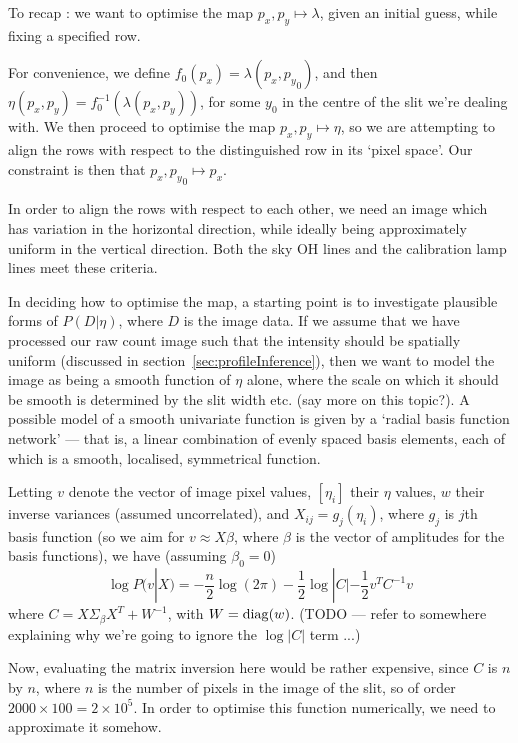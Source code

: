 To recap : we want to optimise the map $p_x, p_y \mapsto \lambda$, given
an initial guess, while fixing a specified row.

For convenience, we define $f_0 (p_x) = \lambda (p_x, {p_y}_0)$, and
then $\eta (p_x, p_y) = f_0^{-1} (\lambda (p_x, p_y))$, for some $y_0$
in the centre of the slit we're dealing with. We then proceed to
optimise the map $p_x, p_y \mapsto \eta$, so we are attempting to align
the rows with respect to the distinguished row in its `pixel space'. Our
constraint is then that $p_x, {p_y}_0 \mapsto p_x$.

In order to align the rows with respect to each other, we need an image
which has variation in the horizontal direction, while ideally being
approximately uniform in the vertical direction. Both the sky OH lines
and the calibration lamp lines meet these criteria.

In deciding how to optimise the map, a starting point is to investigate
plausible forms of $P(D|\eta)$, where $D$ is the image data.
If we assume that we have processed our raw count image such
that the intensity should be spatially uniform (discussed in
section~\ref{sec:profileInference}), then we want to model the image
as being a smooth function of $\eta$ alone, where the scale on which
it should be smooth is determined by the slit width etc. (say more on
this topic?). A possible model of a smooth univariate function is given
by a `radial basis function network' --- that is, a linear combination
of evenly spaced basis elements, each of which is a smooth, localised,
symmetrical function.

Letting $v$ denote the vector of image pixel values, $[\eta_i]$ their $\eta$
values, $w$ their inverse variances (assumed uncorrelated), and $X_{ij}
= g_j (\eta_i)$, where $g_j$ is $j$th basis function (so we aim for $v
\approx X \beta$, where $\beta$ is the vector of amplitudes for the
basis functions), we have (assuming $\beta_0 = 0$) %
\[
\log P(v|X) = -\frac{n}{2}\log (2 \pi) - \frac{1}{2} \log |C| - \frac{1}{2}
v^T C^{-1} v
\]
where $C = X \Sigma_\beta X^T + W^{-1}$, with $W = {\rm diag}(w)$.
(TODO --- refer to somewhere explaining why we're going to ignore
the $\log |C|$ term ...)

Now, evaluating the matrix inversion here would be rather expensive, since
$C$ is $n$ by $n$, where $n$ is the number of pixels in the image of the slit, so
of order $2000 \times 100 = 2 \times 10^5$. In order to optimise this function
numerically, we need to approximate it somehow. 

